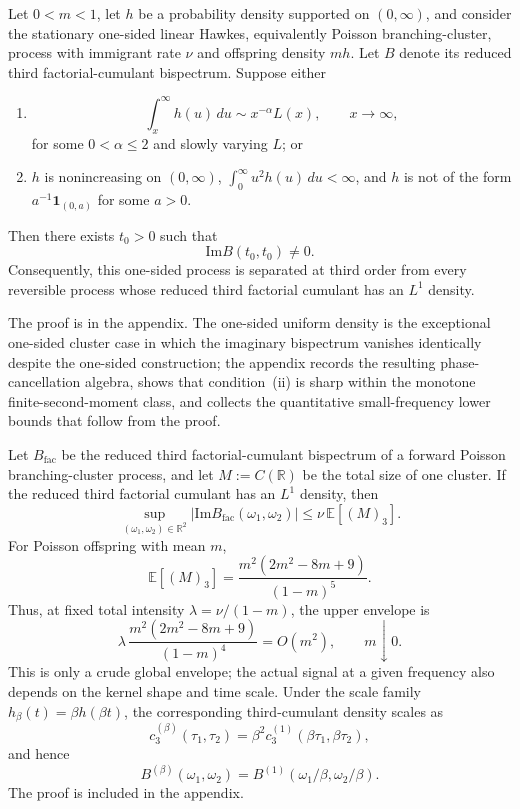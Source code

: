 \documentclass[aap,press]{apt} \volno{00} \partno{00}
\newcommand{\E}{\mathbb{E}}
\newcommand{\R}{\mathbb{R}}
\newcommand{\1}{\mathbf{1}}
\newcommand{\Imm}{\mathrm{Im}}
\numberwithin{equation}{section}
\begin{document}
\begin{prop}\label{prop:nonzero-imag-bispectrum}
Let $0<m<1$, let $h$ be a probability density supported on $(0,\infty)$, and consider the stationary one-sided linear Hawkes, equivalently Poisson branching-cluster, process with immigrant rate $\nu$ and offspring density $mh$. Let $B$ denote its reduced third factorial-cumulant bispectrum. Suppose either
\begin{enumerate}
\item
\[
\int_x^\infty h(u)\,du\sim x^{-\alpha}L(x),\qquad x\to\infty,
\]
for some $0<\alpha\le2$ and slowly varying $L$; or
\item $h$ is nonincreasing on $(0,\infty)$, $\int_0^\infty u^2h(u)\,du<\infty$, and $h$ is not of the form $a^{-1}\1_{(0,a)}$ for some $a>0$.
\end{enumerate}
Then there exists $t_0>0$ such that
\[
\Imm B(t_0,t_0)\neq0.
\]
Consequently, this one-sided process is separated at third order from every reversible process whose reduced third factorial cumulant has an $L^1$ density.
\end{prop}

The proof is in the appendix. The one-sided uniform density is the exceptional one-sided cluster case in which the imaginary bispectrum vanishes identically despite the one-sided construction; the appendix records the resulting phase-cancellation algebra, shows that condition~(ii) is sharp within the monotone finite-second-moment class, and collects the quantitative small-frequency lower bounds that follow from the proof.

\begin{rem}\label{rem:branching-ratio-envelope}
Let $B_{\mathrm{fac}}$ be the reduced third factorial-cumulant
bispectrum of a forward Poisson branching-cluster process, and let
\(M:=C(\R)\) be the total size of one cluster. If the reduced third
factorial cumulant has an \(L^1\) density, then
\[
\sup_{(\omega_1,\omega_2)\in\R^2}
|\Imm B_{\mathrm{fac}}(\omega_1,\omega_2)|
\le
\nu\,\E[(M)_3].
\]
For Poisson offspring with mean $m$,
\[
\E[(M)_3]
=
\frac{m^2(2m^2-8m+9)}{(1-m)^5}.
\]
Thus, at fixed total intensity $\lambda=\nu/(1-m)$, the upper envelope is
\[
\lambda\,\frac{m^2(2m^2-8m+9)}{(1-m)^4}
=O(m^2),
\qquad m\downarrow0.
\]
This is only a crude global envelope; the actual signal at a given frequency also depends on the kernel shape and time scale. Under the scale family $h_\beta(t)=\beta h(\beta t)$, the corresponding third-cumulant density scales as
\[
c_3^{(\beta)}(\tau_1,\tau_2)=\beta^2c_3^{(1)}(\beta\tau_1,\beta\tau_2),
\]
and hence
\[
B^{(\beta)}(\omega_1,\omega_2)=B^{(1)}(\omega_1/\beta,\omega_2/\beta).
\]
The proof is included in the appendix.
\end{rem}
\end{document}
